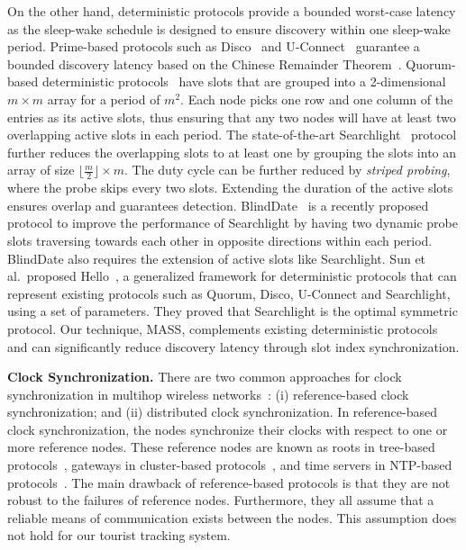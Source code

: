 \documentclass[twoside,twocolumn]{article}
\begin{document}
On the other hand, deterministic protocols provide a bounded worst-case latency as the sleep-wake 
schedule is designed to ensure discovery within one sleep-wake period. Prime-based protocols such 
as Disco~\citep{Dutta2008Practical} and U-Connect~\citep{kandhalu2010u} guarantee a bounded discovery 
latency based on the Chinese Remainder Theorem~\citep{niven2008introduction}. Quorum-based 
deterministic protocols~\citep{tseng2003power,lai2010heterogenous} have slots that are grouped into 
a 2-dimensional $m \times m$ array for a period of $m^2$.  Each node picks one row and one column 
of the entries as its active slots, thus ensuring that any two nodes will have at least two overlapping 
active slots in each period. The state-of-the-art Searchlight~\citep{bakht2012searchlight} protocol 
further reduces the overlapping slots to at least one by grouping the slots into an array of size 
$\lfloor\frac{m}{2}\rfloor \times m$. The duty cycle can be further reduced by {\em striped probing}, 
where the probe skips every two slots. Extending the duration of the active slots ensures overlap
and guarantees detection.  BlindDate~\citep{wang13blinddate} is a recently proposed protocol to 
improve the performance of Searchlight by having two dynamic probe slots traversing towards each other 
in opposite directions within each period. BlindDate also requires the extension of active slots like 
Searchlight.  Sun et al.\ proposed Hello~\citep{sun14hello}, a generalized framework for deterministic
protocols that can represent existing protocols such as Quorum, Disco, U-Connect and Searchlight, using 
a set of parameters.  They proved that Searchlight is the optimal symmetric protocol.  Our technique,
MASS, complements existing deterministic protocols and can significantly reduce discovery latency 
through slot index synchronization.

{\bf Clock Synchronization.} There are two common approaches for clock synchronization in multihop 
wireless networks~\citep{sun14survey}: (i) reference-based clock synchronization; and (ii) distributed 
clock synchronization. In reference-based clock synchronization, the nodes synchronize their clocks 
with respect to one or more reference nodes. These reference nodes are known as roots in tree-based
protocols~\citep{su2005time,ganeriwal2003timing}, gateways in cluster-based protocols~\citep{elson2002fine}, 
and time servers in NTP-based protocols~\citep{ye2008dtp}. The main drawback of reference-based protocols 
is that they are not robust to the failures of reference nodes. Furthermore, they all assume that a 
reliable means of communication exists between the nodes.  This assumption does not hold for our tourist 
tracking system.
\end{document}
